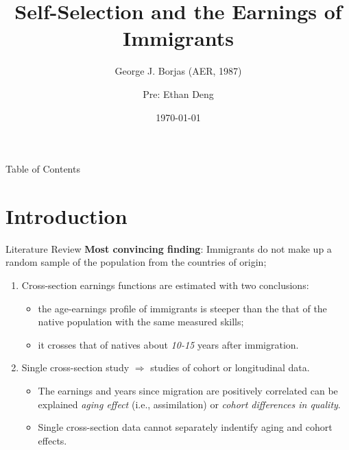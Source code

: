\documentclass[10pt]{beamer}
\begin{document}
\title{Self-Selection and the Earnings of Immigrants}
\subtitle{George J. Borjas (AER, 1987)}
\author{Pre: Ethan Deng}
\date{\today}

\begin{frame}[plain]
  \titlepage
\end{frame}


\begin{frame}{Table of Contents}
  \tableofcontents
\end{frame}


\section{Introduction}

\begin{frame}{Literature Review}
\textbf{Most convincing finding}: Immigrants do not make up a random sample of the population from the countries of origin;

\begin{enumerate}
    \item  Cross-section earnings functions are estimated with two conclusions:
    \begin{itemize}
        \item the age-earnings profile of immigrants is \alert{steeper} than the that of the native population with the same measured skills;
        \item it \alert{crosses} that of natives about \textit{10-15} years after immigration.
    \end{itemize}
    \item Single cross-section study $\Rightarrow$ studies of cohort or longitudinal data.
    \begin{itemize}
        \item The earnings and years since migration are positively correlated can be explained  \textit{aging effect} (i.e., assimilation) or \textit{cohort differences in quality}.
        \item Single cross-section data cannot separately indentify aging and cohort effects.
    \end{itemize}
\end{enumerate}

\end{frame}
\end{document}
